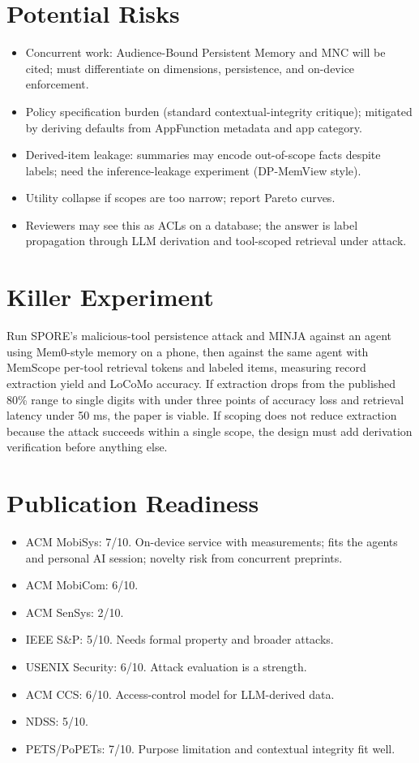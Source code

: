 \documentclass[11pt]{article}
\begin{document}
\section{Potential Risks}
\begin{itemize}
  \item Concurrent work: Audience-Bound Persistent Memory and MNC will be cited; must differentiate on dimensions, persistence, and on-device enforcement.
  \item Policy specification burden (standard contextual-integrity critique); mitigated by deriving defaults from AppFunction metadata and app category.
  \item Derived-item leakage: summaries may encode out-of-scope facts despite labels; need the inference-leakage experiment (DP-MemView style).
  \item Utility collapse if scopes are too narrow; report Pareto curves.
  \item Reviewers may see this as ACLs on a database; the answer is label propagation through LLM derivation and tool-scoped retrieval under attack.
\end{itemize}

\section{Killer Experiment}
Run SPORE's malicious-tool persistence attack and MINJA against an agent using Mem0-style memory on a phone, then against the same agent with MemScope per-tool retrieval tokens and labeled items, measuring record extraction yield and LoCoMo accuracy. If extraction drops from the published 80\% range to single digits with under three points of accuracy loss and retrieval latency under 50 ms, the paper is viable. If scoping does not reduce extraction because the attack succeeds within a single scope, the design must add derivation verification before anything else.

\section{Publication Readiness}
\begin{itemize}
  \item ACM MobiSys: 7/10. On-device service with measurements; fits the agents and personal AI session; novelty risk from concurrent preprints.
  \item ACM MobiCom: 6/10.
  \item ACM SenSys: 2/10.
  \item IEEE S\&P: 5/10. Needs formal property and broader attacks.
  \item USENIX Security: 6/10. Attack evaluation is a strength.
  \item ACM CCS: 6/10. Access-control model for LLM-derived data.
  \item NDSS: 5/10.
  \item PETS/PoPETs: 7/10. Purpose limitation and contextual integrity fit well.
\end{itemize}
\end{document}

